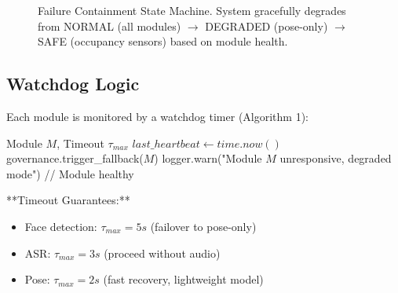 \documentclass[conference]{IEEEtran}
\begin{document}
\begin{figure}[htbp]
\centering
{}
\caption{Failure Containment State Machine. System gracefully degrades from NORMAL (all modules) $\to$ DEGRADED (pose-only) $\to$ SAFE (occupancy sensors) based on module health.}
\label{fig:fsm}
\end{figure}

\subsection{Watchdog Logic}
Each module is monitored by a watchdog timer (Algorithm 1):

\begin{algorithm}[H]
\caption{Module Watchdog}
\begin{algorithmic}[1]
\REQUIRE Module $M$, Timeout $\tau_{max}$
\STATE $last\_heartbeat \leftarrow time.now()$
\STATE governance.trigger\_fallback($M$)
\STATE logger.warn("Module $M$ unresponsive, degraded mode")
\ELSE
\STATE // Module healthy
\ENDIF
\ENDWHILE
\end{algorithmic}
\label{alg:watchdog}
\end{algorithm}

**Timeout Guarantees:**
\begin{itemize}
    \item Face detection: $\tau_{max} = 5s$ (failover to pose-only)
    \item ASR: $\tau_{max} = 3s$ (proceed without audio)
    \item Pose: $\tau_{max} = 2s$ (fast recovery, lightweight model)
\end{itemize}
\end{document}

